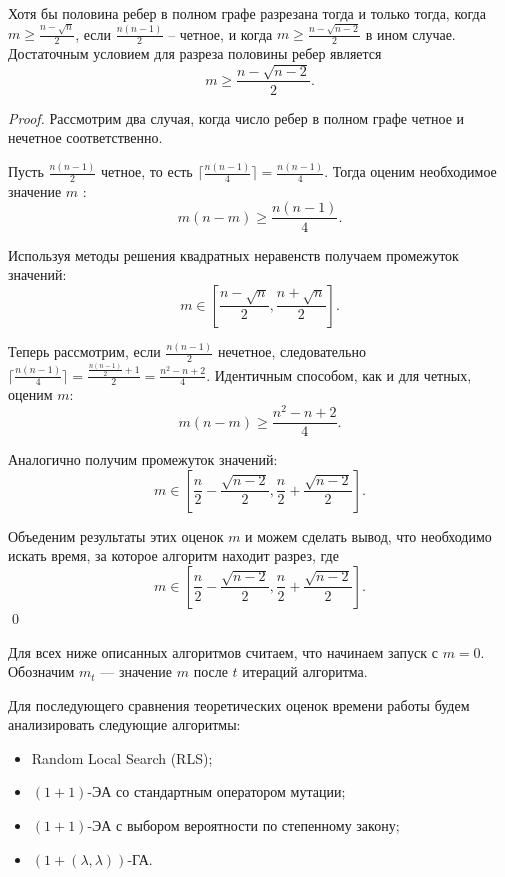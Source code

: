 \documentclass[times]{itmo-student-thesis}
\newcommand{\alglambdaf}{${(1 + (\lambda , \lambda))}$-ГА\xspace}
\newcommand{\oea}{\mbox{$(1 + 1)$-ЭА}\xspace}
\begin{document}
\begin{lemma}
  Хотя бы половина ребер в полном графе разрезана тогда и только тогда, когда $m \ge \frac{n - \sqrt{n}}{2}$, если $\frac{n(n - 1)}{2}$ -- четное, и когда $m \ge \frac{n - \sqrt{n - 2}}{2}$ в ином случае. Достаточным условием для разреза половины ребер является
  \[
    m \ge \frac{n - \sqrt{n - 2}}{2}.
  \]
\end{lemma}

\begin{proof}
  Рассмотрим два случая, когда число ребер в полном графе четное и нечетное соответственно.

  Пусть $\frac{n(n-1)}{2}$ четное, то есть $\lceil \frac{n(n-1)}{4} \rceil = \frac{n(n-1)}{4}$.
  Тогда оценим необходимое значение $m$ :
  $$
    m(n-m) \ge \frac{n(n-1)}{4}.
  $$

  Используя методы решения квадратных неравенств получаем промежуток значений:
  $$
  m \in \left[\frac{n - \sqrt{n}}{2}, \frac{n + \sqrt{n}}{2}\right].
  $$

  Теперь рассмотрим, если $\frac{n(n-1)}{2}$ нечетное, следовательно $\lceil \frac{n(n-1)}{4} \rceil = \frac{\frac{n(n-1)}{2}+1}{2} = \frac{n^2-n+2}{4}$.
  Идентичным способом, как и для четных, оценим $m$:
  $$
    m(n-m) \ge \frac{n^2-n+2}{4}.
  $$

  Аналогично получим промежуток значений:
  $$
  m \in \left[\frac{n}{2} -\frac{\sqrt{n-2}}{2},  \frac{n}{2} + \frac{\sqrt{n-2}}{2}\right].
  $$

  Объеденим результаты этих оценок $m$ и можем сделать вывод, что необходимо искать время, за которое алгоритм находит разрез, где
  $$
  m \in \left[\frac{n}{2} -\frac{\sqrt{n-2}}{2},  \frac{n}{2} + \frac{\sqrt{n-2}}{2}\right].
  $$
  \qed
\end{proof}

Для всех ниже описанных алгоритмов считаем, что начинаем запуск с $m = 0$. Обозначим $m_t$ --- значение $m$ после $t$ итераций алгоритма.

Для последующего сравнения теоретических оценок времени работы будем анализировать следующие алгоритмы:
\begin{itemize}
  \item Random Local Search (RLS);
  \item \oea со стандартным оператором мутации;
  \item \oea с выбором вероятности по степенному закону;
  \item \alglambdaf.
\end{itemize}
\end{document}
